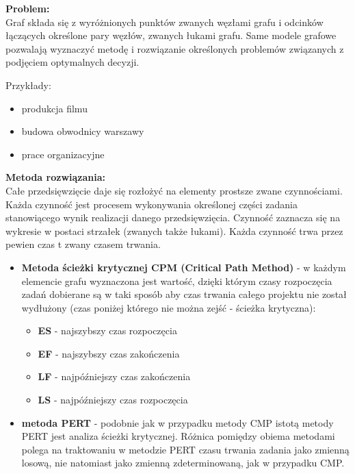 \documentclass[10pt, a
4paper]{article}
\begin{document}
\noindent \textbf{Problem:}\\
Graf składa się z wyróżnionych punktów zwanych węzłami grafu i odcinków łączących określone pary węzłów, zwanych  łukami grafu. Same modele grafowe pozwalają wyznaczyć metodę i rozwiązanie określonych problemów związanych z podjęciem optymalnych decyzji. 

Przykłady:
\begin{itemize}
\item produkcja filmu
\item budowa obwodnicy warszawy
\item prace organizacyjne 
\end{itemize}

\noindent \textbf{Metoda rozwiązania:}\\
Całe przedsięwzięcie daje się rozłożyć na elementy prostsze zwane czynnościami. Każda czynność jest procesem wykonywania określonej części zadania stanowiącego wynik realizacji danego przedsięwzięcia. Czynność zaznacza się na wykresie w postaci strzałek (zwanych także łukami). Każda czynność trwa przez pewien czas t zwany czasem trwania. 

\begin{itemize}
\item \textbf{Metoda ścieżki krytycznej CPM (Critical Path Method)} - w każdym elemencie grafu wyznaczona jest wartość, dzięki którym czasy rozpoczęcia zadań dobierane są w taki sposób aby czas trwania całego projektu nie został wydłużony (czas poniżej którego nie można zejść - ścieżka krytyczna):
\begin{itemize}
\item \textbf{ES} - najszybszy czas rozpoczęcia 
\item \textbf{EF} - najszybszy czas zakończenia
\item \textbf{LF} - najpóźniejszy czas zakończenia
\item \textbf{LS} - najpóźniejszy czas rozpoczęcia 
\end{itemize}

\item \textbf{metoda PERT} - podobnie jak w przypadku metody CMP istotą metody PERT jest analiza ścieżki krytycznej. Różnica pomiędzy obiema metodami polega na traktowaniu w metodzie PERT czasu trwania zadania jako zmienną losową, nie natomiast jako zmienną zdeterminowaną, jak w przypadku CMP.
\end{itemize}
\end{document}

